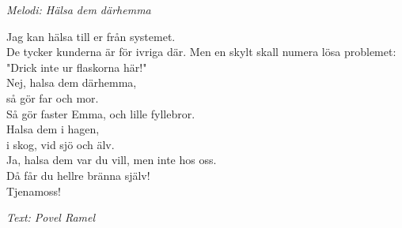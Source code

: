 {\footnotesize\textit{Melodi: Hälsa dem därhemma}}\par
\vspace{10pt}
Jag kan hälsa till er från systemet.\\
De tycker kunderna är för ivriga där.
Men en skylt skall numera lösa problemet:\\
"Drick inte ur flaskorna här!"\\
Nej, halsa dem därhemma,\\
så gör far och mor.\\
Så gör faster Emma, och lille fyllebror.\\
Halsa dem i hagen,\\
i skog, vid sjö och älv.\\
Ja, halsa dem var du vill, men inte hos oss.\\
Då får du hellre bränna själv!\\
Tjenamoss!\par
\vspace{10pt}
{\footnotesize\textit{Text: Povel Ramel}}
